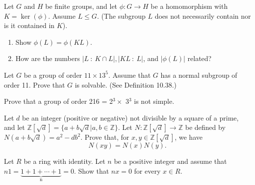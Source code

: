 \documentclass[12pt,letterpaper,boxed]{hmcpset}
\begin{document}

\begin{problem}[11.5.11]
Let $G$ and $H$ be finite groups, and let $\phi: G \rightarrow H$ be a homomorphism with $K = \ker(\phi)$. Assume $L \leq G$. (The subgroup $L$ does not necessarily contain nor is it contained in $K$).
\begin{enumerate}[label=\alph*]
\item Show $\phi(L) = \phi(KL)$.
\item How are the numbers $\vert L \ : \ K \cap L \vert, \vert KL \ : \ L \vert$, and $\vert \phi(L) \vert$ related?
\end{enumerate}
\end{problem}

\begin{solution}
\end{solution}

\clearpage

\begin{problem}[12.1.4]
Let $G$ be a group of order $11 \times 13^5$. Assume that $G$ has a normal subgroup of order 11. Prove that $G$ is solvable. (See Definition 10.38.)
\end{problem}

\begin{solution}
\end{solution}

\clearpage

\begin{problem}[12.2.2]
Prove that a group of order 216 = 2$^3 \times$ 3$^3$ is not simple.
\end{problem}

\begin{solution}
\end{solution}

\clearpage

\begin{problem}[15.1.3]
Let $d$ be an integer (positive or negative) not divisible by a square of a prime, and let $\mathbb{Z}[ \sqrt{d} ] = \{a + b\sqrt{d} \vert a,b \in \mathbb{Z}\}$. Let $N : \mathbb{Z}[\sqrt{d}] \rightarrow \mathbb{Z}$ be defined by $N(a + b\sqrt{d}) = a^2 - db^2$. Prove that, for $x,y \in \mathbb{Z}[\sqrt{d}]$, we have
$$ N(xy) = N(x)N(y). $$
\end{problem}

\begin{solution}
\end{solution}

\clearpage

\begin{problem}[15.2.14]
Let $R$ be a ring with identity. Let $n$ be a positive integer and assume that $n1 = \underbrace{1 + 1 + \cdots + 1}_\text{n} = 0$. Show that $nx = 0$ for every $x \in R$.
\end{problem}

\begin{solution}

\end{solution}
\end{document}
